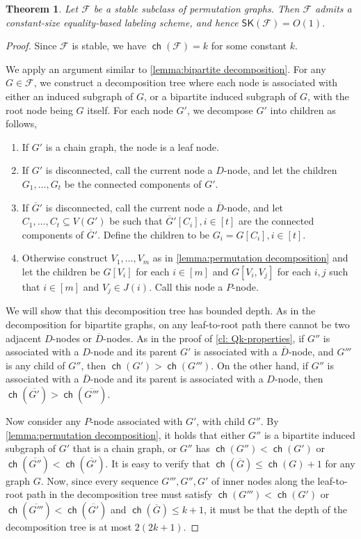\documentclass{article}
\newtheorem{theorem}{Theorem}\newtheorem{lemma}[theorem]{Lemma}\newtheorem{proposition}[theorem]{Proposition}\newtheorem{corollary}[theorem]{Corollary}\newtheorem{definition}[theorem]{Definition}\newtheorem{claim}[theorem]{Claim}\newtheorem{remark}[theorem]{Remark}\newtheorem{observation}[theorem]{Observation}\newtheorem{conjecture}[theorem]{Conjecture}\newtheorem{example}[theorem]{Example}
\newcommand{\cF}{\ensuremath{\mathcal{F}}}
\newcommand{\RL}{\mathsf{SK}}
\DeclareMathOperator\ch{\mathsf{ch}}
\begin{document}
\begin{theorem}
\label{thm:permutation graphs}
Let $\cF$ be a stable subclass of permutation graphs. Then $\cF$ admits a constant-size
equality-based labeling scheme, and hence $\RL(\cF) = O(1)$.
\end{theorem}
\begin{proof}
Since $\cF$ is stable, we have $\ch(\cF) = k$ for some constant $k$.

We apply an argument similar to \cref{lemma:bipartite decomposition}. For any $G \in \cF$, we
construct a decomposition tree where each node is associated with either an induced subgraph of
$G$, or a bipartite induced subgraph of $G$, with the root node being $G$ itself. For each node
$G'$, we decompose $G'$ into children as follows,
\begin{enumerate}
  \item If $G'$ is a chain graph, the node is a leaf node.
  \item If $G'$ is disconnected, call the current node a $D$-node, and let the children $G_1,
    \dotsc, G_t$ be the connected components of $G'$.
  \item If $\overline G'$ is disconnected, call the current node a $\overline D$-node, and let
    $C_1, \dotsc, C_t \subseteq V(G')$ be such that $\overline{G}'[C_i], i \in [t]$ are the connected components of 
    $\overline G'$. Define the children to be $G_i = G[C_i], i \in [t]$.
  \item Otherwise construct $V_1, \dotsc, V_m$ as in \cref{lemma:permutation decomposition} and
    let the children be $G[V_i]$ for each $i \in [m]$ and $G[V_i,V_j]$ for each $i,j$ such that $i \in [m]$ and
    $V_j \in J(i)$. Call this node a $P$-node.
\end{enumerate}

We will show that this decomposition tree has bounded depth.  As in the decomposition for bipartite
graphs, on any leaf-to-root path there cannot be two adjacent $D$-nodes or $\overline D$-nodes. As
in the proof of \cref{cl: Qk-properties}, if $G''$ is associated with a $D$-node and its parent $G'$
is associated with a $\overline D$-node, and $G'''$ is any child of $G''$, then $\ch(G') >
\ch(G''')$. On the other hand, if $G''$ is associated with a $\overline D$-node and its parent is
associated with a $D$-node, then $\ch(\overline{G'}) > \ch(\overline{G'''})$.

Now consider any $P$-node associated with $G'$, with child $G''$. By \cref{lemma:permutation
decomposition}, it holds that either $G''$ is a bipartite induced subgraph of $G'$ that is a chain
graph, or $G''$ has $\ch(G'') < \ch(G')$ or $\ch(\overline{G''}) < \ch(\overline{G'})$.  It is easy
to verify that $\ch(\overline{G}) \leq \ch(G)+1$ for any graph $G$. Now, since every sequence
$G''',G'',G'$ of inner nodes along the leaf-to-root path in the decomposition tree must satisfy
$\ch(G''') < \ch(G')$ or $\ch(\overline{G'''}) < \ch(\overline{G'})$ and $\ch(\overline G) \leq
k+1$, it must be that the depth of the decomposition tree is at most $2(2k+1)$.


\end{proof}
\end{document}
